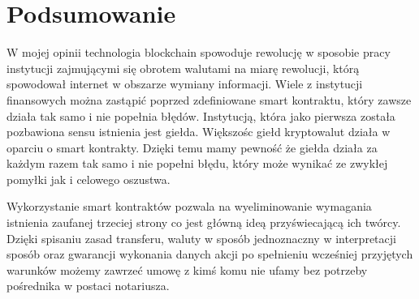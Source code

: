 \documentclass[]{llncs}
\renewcommand{\cite}[1]{~\oldcite{#1}}
\begin{document}


\section{Podsumowanie}

  W mojej opinii technologia blockchain spowoduje rewolucję w sposobie pracy
  instytucji zajmującymi się obrotem walutami na miarę rewolucji, którą
  spowodował internet w obszarze wymiany informacji. Wiele z instytucji
  finansowych można zastąpić poprzed zdefiniowane smart kontraktu, który zawsze
  działa tak samo i nie popełnia błędów. Instytucją, która jako pierwsza została
  pozbawiona sensu istnienia jest giełda. Większośc giełd kryptowalut działa w
  oparciu o smart kontrakty. Dzięki temu mamy pewność że giełda działa za każdym
  razem tak samo i nie popełni błędu, który może wynikać ze zwykłej pomyłki jak
  i celowego oszustwa.

  Wykorzystanie smart kontraktów pozwala na wyeliminowanie wymagania istnienia
  zaufanej trzeciej strony co jest główną ideą przyświecającą ich twórcy. Dzięki
  spisaniu zasad transferu, waluty w sposób jednoznaczny w interpretacji sposób
  oraz gwarancji wykonania danych akcji po spełnieniu wcześniej przyjętych
  warunków możemy zawrzeć umowę z kimś komu nie ufamy bez potrzeby pośrednika w
  postaci notariusza.

%
%
%

% 
\end{document}
